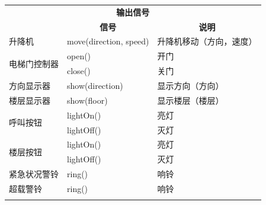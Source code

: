\begin{center}
\begin{longtable}{l l l}
	\hline \hline
	\multicolumn{3}{c}{\textbf{输出信号}} \\
	\hdashline
	\multicolumn{1}{c}{\textbf{组件}} &
	\multicolumn{1}{c}{\textbf{信号}} &
	\multicolumn{1}{c}{\textbf{说明}} \\ \cmidrule(lr){1-1} \cmidrule(lr){2-2} \cmidrule(lr){3-3}
	升降机
	& move(direction, speed) & 升降机移动（方向，速度）\\ \cmidrule(lr){1-3}

	\multirow{2}{*}{电梯门控制器}
	& open() & 开门 \\
	& close() & 关门 \\ \cmidrule(lr){1-3}

	方向显示器
	& show(direction) & 显示方向（方向） \\ \cmidrule(lr){1-3}

	楼层显示器
	& show(floor) & 显示楼层（楼层） \\ \cmidrule(lr){1-3}

	\multirow{2}{*}{呼叫按钮}
	& lightOn() & 亮灯 \\
	& lightOff() & 灭灯 \\ \cmidrule(lr){1-3}

	\multirow{2}{*}{楼层按钮}
	& lightOn() & 亮灯 \\
	& lightOff() & 灭灯 \\ \cmidrule(lr){1-3}

	紧急状况警铃
	& ring() & 响铃 \\ \cmidrule(lr){1-3}

	超载警铃
	& ring() & 响铃 \\
	\bottomrule
	\label{tab:inputSignals}
\end{longtable}
\end{center}

